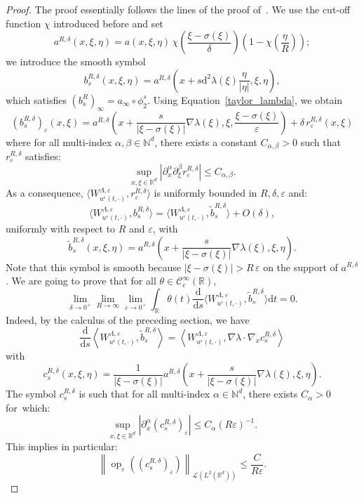\documentclass[AHL,Unicode,longabstracts]{cedram}
\DeclareMathOperator{\op}{op}
\newcommand*\R{{\mathbb R}}
\newcommand*\N{{\mathbb N}}
\newcommand*\eps{\varepsilon}
\numberwithin{equation}{section}
\newcommand*{\dd}{\mathrm{d}}
\newcommand*{\dt}{\dd t}
\newcommand*{\ds}{\dd s}
\begin{document}
\begin{proof}
The proof essentially follows the lines of the proof of~\cite[Theorem~2.5]{AFM:15}. We use the cut-off function $\chi$ introduced before and set
\[
a^{R,\delta}(x,\xi,\eta)= a(x,\xi,\eta)\,\chi\left(\frac{\xi-\sigma(\xi)}{\delta}\right)\left(1-\chi\left(\frac{\eta}{R}\right)\right);
\]
we introduce the smooth symbol
\[
b^{R,\delta}_s(x,\xi,\eta)= a^{R,\delta}\left(x+s \dd^2\lambda(\xi) \frac{\eta}{|\eta|},\xi,\eta\right),
\]
which satisfies $(b_s^{R})_\infty = a_\infty\circ\phi^s_2.$ Using Equation~\eqref{taylor_lambda}, we obtain
\[
\left(b^{R,\delta} _s\right)_\eps (x,\xi) =a^{R,\delta}\left(x+\frac{s}{|\xi-\sigma(\xi)|} \nabla\lambda(\xi),\xi,\frac{\xi-\sigma(\xi)}{\eps}\right) +\delta \, r_\eps^{R,\delta}(x,\xi)
\]
where for all multi-index $\alpha,\beta \in \N^d$, there exists a constant $C_{\alpha,\beta}>0$ such that $r_\eps^{R,\delta}$ satisfies:
\[
\sup_{x,\xi\in\R^d}\left|\partial_x^\alpha\partial_\xi^\beta r^{R,\delta}_\eps\right| \leq C_{\alpha,\beta}.
\]
As a consequence, $\langle W_{u^\eps(t,\cdot)}^{\Lambda,\eps}, r_\eps ^{R,\delta}\rangle $ is uniformly bounded in $R,\delta,\eps$ and:
\[
\langle W_{u^\eps(t,\cdot)}^{\Lambda,\eps}, b^{R,\delta}_s \rangle = \langle W_{u^\eps(t,\cdot)}^{\Lambda,\eps}, \widetilde b^{R,\delta}_s\rangle +O(\delta),
\]
uniformly with respect to $R$ and $\eps$, with
\[
\widetilde b^{R,\delta}_s(x,\xi,\eta)=a^{R,\delta}\left(x+\frac{s}{|\xi-\sigma(\xi)|} \nabla\lambda(\xi),\xi,\eta\right).
\]
Note that this symbol is smooth because $|\xi-\sigma(\xi)|>R\,\eps $ on the support of $a^{R,\delta}$. We are going to prove that for all $\theta\in{\mathcal C}_c^\infty(\R)$,
\[
\lim_{\delta\to 0^+}\lim_{R\to\infty} \lim_{\eps\to 0^+}\int_\R\theta(t) \frac{\dd}{\ds} \langle W_{u^\eps(t,\cdot)}^{\Lambda,\eps}, \widetilde b^{R,\delta}_s\rangle \dt =0.
\]
Indeed, by the calculus of the preceding section, we have
\[
\frac{\dd}{\ds} \left\langle W_{u^\eps(t,\cdot)}^{\Lambda,\eps}, \widetilde b^{R,\delta}_s\right\rangle= \left\langle W_{u^\eps(t,\cdot)}^{\Lambda,\eps}, \nabla\lambda\cdot \nabla_x c^{R,\delta}_s\right\rangle
\]
with
\[
c^{R,\delta}_s (x,\xi,\eta) =\frac{1}{|\xi-\sigma(\xi)| }a^{R,\delta}\left(x+\frac{s}{|\xi-\sigma(\xi)|} \nabla\lambda(\xi),\xi,\eta\right).
\]
The symbol $c^{R,\delta}_s$ is such that for all multi-index $\alpha \in \N^d$, there exists $C_{\alpha}>0$ for~which:
\[
\sup_{x,\xi\in\R^d}\left|\partial_x^\alpha (c_s^{R,\delta})_\eps\right| \leq C_{\alpha} (R\eps)^{-1}.
\]
This implies in particular:
\[
\left\| \op_\eps((c^{R,\delta}_s)_\eps)\right\|_{{\mathcal L}(L^2(\R^d))}\leq \frac{C}{R\eps}.
\]
\end{proof}
\end{document}
